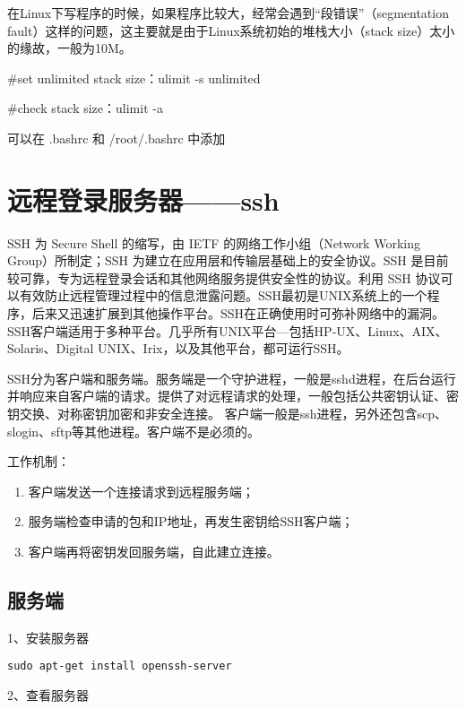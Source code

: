 在Linux下写程序的时候，如果程序比较大，经常会遇到“段错误”（segmentation fault）这样的问题，这主要就是由于Linux系统初始的堆栈大小（stack size）太小的缘故，一般为10M。

\#set unlimited stack size：ulimit -s unlimited

\#check stack size：ulimit -a

可以在 .bashrc 和 /root/.bashrc 中添加


\section{远程登录服务器——ssh}
SSH 为 Secure Shell 的缩写，由 IETF 的网络工作小组（Network Working Group）所制定；SSH 为建立在应用层和传输层基础上的安全协议。SSH 是目前较可靠，专为远程登录会话和其他网络服务提供安全性的协议。利用 SSH 协议可以有效防止远程管理过程中的信息泄露问题。SSH最初是UNIX系统上的一个程序，后来又迅速扩展到其他操作平台。SSH在正确使用时可弥补网络中的漏洞。SSH客户端适用于多种平台。几乎所有UNIX平台—包括HP-UX、Linux、AIX、Solaris、Digital UNIX、Irix，以及其他平台，都可运行SSH。

SSH分为客户端和服务端。服务端是一个守护进程，一般是sshd进程，在后台运行并响应来自客户端的请求。提供了对远程请求的处理，一般包括公共密钥认证、密钥交换、对称密钥加密和非安全连接。
客户端一般是ssh进程，另外还包含scp、slogin、sftp等其他进程。客户端不是必须的。

工作机制：
\begin{enumerate}
\item 客户端发送一个连接请求到远程服务端；
\item 服务端检查申请的包和IP地址，再发生密钥给SSH客户端；
\item 客户端再将密钥发回服务端，自此建立连接。
\end{enumerate}


\subsection{服务端}
1、安装服务器

\verb|sudo apt-get install openssh-server|

2、查看服务器

